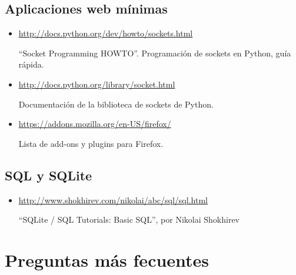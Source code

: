 {%
\subsection{Aplicaciones web mínimas}

\begin{itemize}
\item \url{http://docs.python.org/dev/howto/sockets.html}

``Socket Programming HOWTO''. Programación de sockets en Python, guía rápida.

\item \url{http://docs.python.org/library/socket.html}

Documentación de la biblioteca de sockets de Python.

\item \url{https://addons.mozilla.org/en-US/firefox/} 

Lista de add-ons y plugins para Firefox.

\end{itemize}

\subsection{SQL y SQLite}


\begin{itemize}
\item \url{http://www.shokhirev.com/nikolai/abc/sql/sql.html}

``SQLite / SQL Tutorials: Basic SQL'', por Nikolai Shokhirev

\end{itemize}


\section{Preguntas más fecuentes}


}
